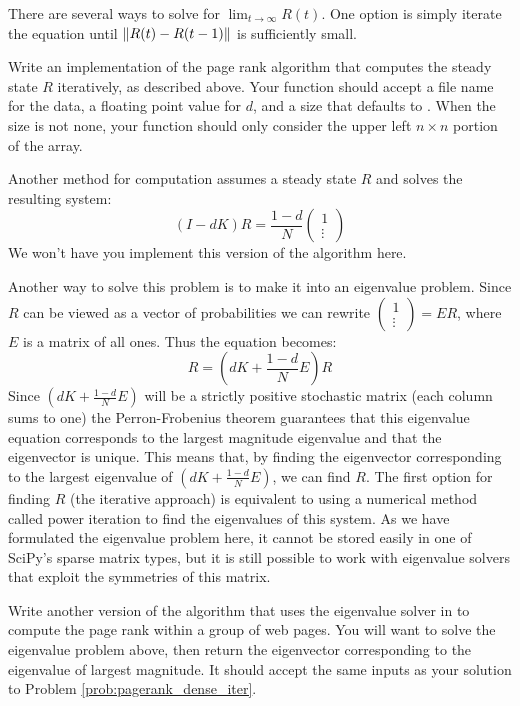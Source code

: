 There are several ways to solve for $\lim_{t \to \infty} R(t)$.
One option is simply iterate the equation until $\left\lVert R(t)-R(t-1)\right\rVert$ is sufficiently small.

\begin{problem}
\label{prob:pagerank_dense_iter}
Write an implementation of the page rank algorithm that computes the steady state $R$ iteratively, as described above.
Your function should accept a file name for the data, a floating point value for $d$, and a size  that defaults to .
When the size is not none, your function should only consider the upper left $n \times n$ portion of the array.
\end{problem}

Another method for computation assumes a steady state $R$ and solves the resulting system:
\[(I-dK)R = \frac{1-d}{N} \begin{pmatrix}1\\\vdots\end{pmatrix}\]
We won't have you implement this version of the algorithm here.

Another way to solve this problem is to make it into an eigenvalue problem.
Since $R$ can be viewed as a vector of probabilities we can rewrite $\left(\begin{smallmatrix}1\\\vdots\end{smallmatrix}\right) = E R$, where $E$ is a matrix of all ones.
Thus the equation becomes:
\[R = (dK + \frac{1-d}{N}E)R\]
Since $(dK + \frac{1-d}{N}E)$ will be a strictly positive stochastic matrix (each column sums to one) the Perron-Frobenius theorem guarantees that this eigenvalue equation corresponds to the largest magnitude eigenvalue and that the eigenvector is unique.
This means that, by finding the eigenvector corresponding to the largest eigenvalue of $(dK + \frac{1-d}{N}E)$, we can find $R$.
The first option for finding $R$ (the iterative approach) is equivalent to using a numerical method called power iteration to find the eigenvalues of this system.
As we have formulated the eigenvalue problem here, it cannot be stored easily in one of SciPy's sparse matrix types, but it is still possible to work with eigenvalue solvers that exploit the symmetries of this matrix.

\begin{problem}
Write another version of the algorithm that uses the eigenvalue solver in  to compute the page rank within a group of web pages.
You will want to solve the eigenvalue problem above, then return the eigenvector corresponding to the eigenvalue of largest magnitude.
It should accept the same inputs as your solution to Problem \ref{prob:pagerank_dense_iter}.
\end{problem}

